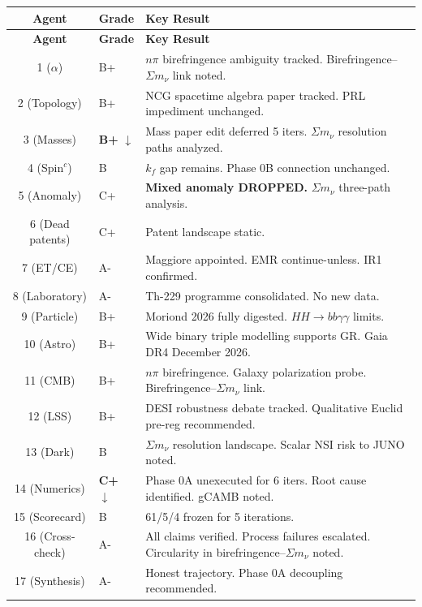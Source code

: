 \documentclass[11pt,a4paper]{article}
\begin{document}
\begin{center}
\begin{longtable}{clp{9cm}}
\toprule
\textbf{Agent} & \textbf{Grade} & \textbf{Key Result} \\
\midrule
\endfirsthead
\toprule
\textbf{Agent} & \textbf{Grade} & \textbf{Key Result} \\
\midrule
\endhead
1 ($\alpha$) & B+ & $n\pi$ birefringence ambiguity tracked. Birefringence--$\Sigma m_\nu$ link noted. \\
2 (Topology) & B+ & NCG spacetime algebra paper tracked. PRL impediment unchanged. \\
3 (Masses) & \textbf{B+} $\downarrow$ & Mass paper edit deferred 5 iters. $\Sigma m_\nu$ resolution paths analyzed. \\
4 (Spin$^c$) & B & $k_f$ gap remains. Phase 0B connection unchanged. \\
5 (Anomaly) & C+ & \textbf{Mixed anomaly DROPPED.} $\Sigma m_\nu$ three-path analysis. \\
6 (Dead patents) & C+ & Patent landscape static. \\
7 (ET/CE) & A- & Maggiore appointed. EMR continue-unless. IR1 confirmed. \\
8 (Laboratory) & A- & Th-229 programme consolidated. No new data. \\
9 (Particle) & B+ & Moriond 2026 fully digested. $HH \to bb\gamma\gamma$ limits. \\
10 (Astro) & B+ & Wide binary triple modelling supports GR. Gaia DR4 December 2026. \\
11 (CMB) & B+ & $n\pi$ birefringence. Galaxy polarization probe. Birefringence--$\Sigma m_\nu$ link. \\
12 (LSS) & B+ & DESI robustness debate tracked. Qualitative Euclid pre-reg recommended. \\
13 (Dark) & B & $\Sigma m_\nu$ resolution landscape. Scalar NSI risk to JUNO noted. \\
14 (Numerics) & \textbf{C+} $\downarrow$ & Phase 0A unexecuted for 6 iters. Root cause identified. gCAMB noted. \\
15 (Scorecard) & B & 61/5/4 frozen for 5 iterations. \\
16 (Cross-check) & A- & All claims verified. Process failures escalated. Circularity in birefringence--$\Sigma m_\nu$ noted. \\
17 (Synthesis) & A- & Honest trajectory. Phase 0A decoupling recommended. \\
\bottomrule
\end{longtable}
\end{center}
\end{document}
